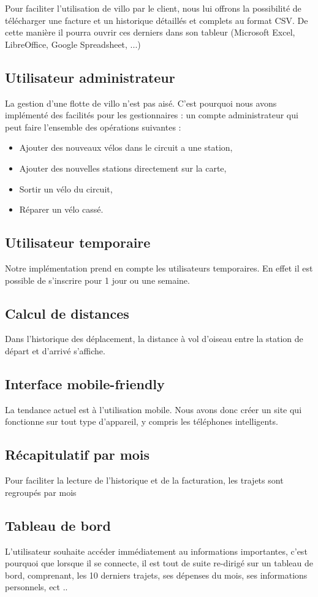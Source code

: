 \documentclass[a4paper,10pt]{article}
\begin{document}
Pour faciliter l'utilisation de villo par le client, nous lui offrons la possibilité de télécharger une facture et un historique détaillés et complets au format CSV. De cette manière il pourra ouvrir ces derniers dans son tableur (Microsoft Excel, LibreOffice, Google Spreadsheet, ...)

\subsection{Utilisateur administrateur}
La gestion d'une flotte de villo n'est pas aisé. C'est pourquoi nous avons implémenté des facilités pour les gestionnaires : un compte administrateur qui peut faire l'ensemble des opérations suivantes : 
\begin{itemize}
	\item Ajouter des nouveaux vélos dans le circuit a une station,
	\item Ajouter des nouvelles stations directement sur la carte,
	\item Sortir un vélo du circuit,
	\item Réparer un vélo cassé.
\end{itemize}

\subsection{Utilisateur temporaire}
Notre implémentation prend en compte les utilisateurs temporaires. En effet il est possible de s'inscrire pour 1 jour ou une semaine.

\subsection{Calcul de distances}
Dans l'historique des déplacement, la distance à vol d'oiseau entre la station de départ et d'arrivé s'affiche.

\subsection{Interface mobile-friendly}
La tendance actuel est à l'utilisation mobile. Nous avons donc créer un site qui fonctionne sur tout type d'appareil, y compris les téléphones intelligents. 

\subsection{Récapitulatif par mois}
Pour faciliter la lecture de l'historique et de la facturation, les trajets sont regroupés par mois

\subsection{Tableau de bord}
L'utilisateur souhaite accéder immédiatement au informations importantes, c'est pourquoi que lorsque il se connecte, il est tout de suite re-dirigé sur un tableau de bord, comprenant, les 10 derniers trajets, ses dépenses du mois, ses informations personnels, ect ..
\end{document}
